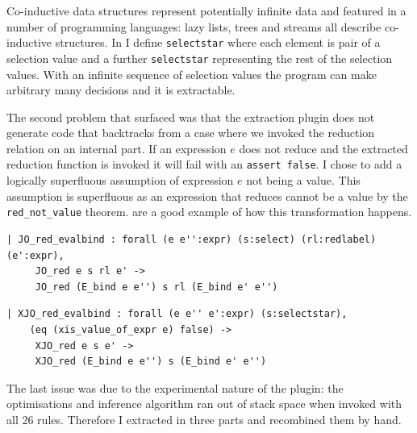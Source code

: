 \documentclass[12pt,twoside,notitlepage]{report}
\begin{document}
Co-inductive data structures represent potentially infinite data and featured in a number of programming languages: lazy lists, trees and streams all describe co-inductive structures. In  I define \verb|selectstar| where each element is pair of a selection value and a further \verb|selectstar| representing the rest of the selection values.  With an infinite sequence of selection values the program can make arbitrary many decisions and it is extractable.

The second problem that surfaced was that the extraction plugin does not generate code that backtracks from a case where we invoked the reduction relation on an internal part. If an expression $ e $ does not reduce and the extracted reduction function is invoked it will fail with an \lstinline|assert false|. I chose to add a logically superfluous assumption of expression $ e $ not being a value. This assumption is superfluous as an expression that reduces cannot be a value by the \verb|red_not_value| theorem.   are a good example of how this transformation happens. \vspace{4mm}

\begin{minipage}{0.9\linewidth}
\begin{lstlisting}[language={Coq},caption={Coq reduction clause with unsafe assumption}, label={lst:coqredunsafe}]
| JO_red_evalbind : forall (e e'':expr) (s:select) (rl:redlabel) (e':expr),
     JO_red e s rl e' ->
     JO_red (E_bind e e'') s rl (E_bind e' e'')
\end{lstlisting}
\end{minipage}

\begin{minipage}{\linewidth}
\begin{lstlisting}[language={Coq},caption={Coq extractable reduction clause with safe assumption}, label={lst:coqxredsafe}]
 | XJO_red_evalbind : forall (e e'' e':expr) (s:selectstar),
    (eq (xis_value_of_expr e) false) ->
     XJO_red e s e' ->
     XJO_red (E_bind e e'') s (E_bind e' e'')
\end{lstlisting}
\end{minipage}


The last issue was due to the experimental nature of the plugin: the optimisations and inference algorithm ran out of stack space when invoked with all 26 rules. Therefore I extracted in three parts and recombined them by hand.
\end{document}
